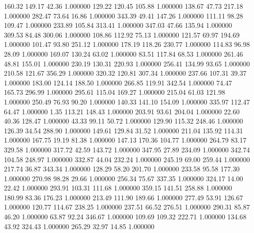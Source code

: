     160.32    149.17     42.36  1.000000
    129.22    120.45    105.88  1.000000
    138.67     47.73    217.18  1.000000
    282.47     73.64     16.86  1.000000
    343.39     49.41    147.26  1.000000
    111.11     98.28    109.47  1.000000
    233.89    105.84    313.41  1.000000
    347.03     47.66    135.94  1.000000
    309.53     84.48    300.06  1.000000
    108.86    112.92     75.13  1.000000
    121.57     69.97    194.69  1.000000
    101.47     93.80    251.12  1.000000
    178.19    118.26    230.77  1.000000
    114.83     96.98     28.09  1.000000
    169.07    130.24     63.02  1.000000
     83.51    117.84     68.53  1.000000
    261.46     48.81    155.01  1.000000
    230.19    130.31    220.93  1.000000
    256.41    134.99     93.65  1.000000
    210.58    121.67    356.29  1.000000
    320.32    120.81    307.34  1.000000
    237.66    107.31     39.37  1.000000
    183.00    124.14    188.50  1.000000
    266.85    119.91    342.54  1.000000
     74.47    165.73    296.99  1.000000
    295.61    115.04    169.27  1.000000
    215.04     61.03    121.98  1.000000
    250.49     76.93     90.20  1.000000
    140.33    141.10    154.09  1.000000
    335.97    112.47     64.47  1.000000
      1.35    113.21    148.43  1.000000
    203.91     93.61    204.04  1.000000
     22.60     40.36    128.47  1.000000
     43.33     99.11     50.72  1.000000
    129.90    115.32    248.46  1.000000
    126.39     34.54    288.90  1.000000
    149.61    129.84     31.52  1.000000
    211.04    135.92    114.31  1.000000
    167.75     19.19     81.38  1.000000
    147.13    170.36    104.77  1.000000
    264.79     83.17    329.58  1.000000
    317.72     42.59    143.72  1.000000
    347.95     27.89    234.09  1.000000
    342.74    104.58    248.97  1.000000
    332.87     44.04    232.24  1.000000
    245.19     69.00    259.44  1.000000
    217.74     36.87    343.34  1.000000
    128.29     58.20    201.70  1.000000
    233.58     95.58    177.30  1.000000
    270.98     98.28     29.66  1.000000
    256.34     75.67    337.35  1.000000
    324.17     14.00     22.42  1.000000
    293.91    103.31    111.68  1.000000
    359.15    141.51    258.88  1.000000
    180.99     83.36    176.23  1.000000
    213.49    111.90    189.66  1.000000
    277.49     53.91    126.67  1.000000
    120.77    114.67    238.25  1.000000
    237.51     66.52    276.51  1.000000
    290.31     85.87     46.20  1.000000
     63.87     92.24    346.67  1.000000
    109.69    109.32    222.71  1.000000
    134.68     43.92    324.43  1.000000
    265.29     32.97     14.85  1.000000
